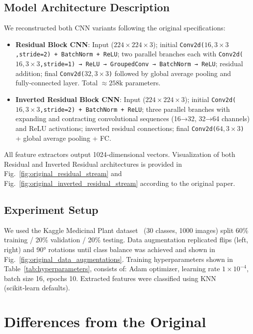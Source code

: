 \documentclass[journal,onecolumn]{IEEEtran}
\begin{document}
\subsection{Model Architecture Description}
We reconstructed both CNN variants following the original specifications:
\begin{itemize}
  \item \textbf{Residual Block CNN}: Input ($224\times224\times3$); initial \texttt{Conv2d($16,3\times3$,stride=2) + BatchNorm + ReLU}; two parallel branches each with \texttt{Conv2d($16,3\times3$,stride=1) → ReLU → GroupedConv → BatchNorm → ReLU}; residual addition; final \texttt{Conv2d($32,3\times3$)} followed by global average pooling and fully‑connected layer. Total \(\approx258\text{k}\) parameters.
  \item \textbf{Inverted Residual Block CNN}: Input ($224\times224\times3$); initial \texttt{Conv2d($16,3\times3$,stride=2) + BatchNorm + ReLU}; three parallel branches with expanding and contracting convolutional sequences (16→32, 32→64 channels) and ReLU activations; inverted residual connections; final \texttt{Conv2d($64,3\times3$)} + global average pooling + FC.
\end{itemize}
All feature extractors output 1024‑dimensional vectors. Visualization of both Residual and Inverted Residual architectures is provided in Fig.~\ref{fig:original_residual_stream} and Fig.~\ref{fig:original_inverted_residual_stream} according to the original paper.

\subsection{Experiment Setup}
We used the Kaggle Medicinal Plant dataset~\cite{KaggleDataset} (30 classes, 1000 images) split 60\% training / 20\% validation / 20\% testing. Data augmentation replicated flips (left, right) and 90° rotations until class balance was achieved and shown in Fig.~\ref{fig:original_data_augmentations}. Training hyperparameters shown in Table~\ref{tab:hyperparameters}, consists of: Adam optimizer, learning rate \(1\times10^{-4}\), batch size 16, epochs 10. Extracted features were classified using KNN (scikit‑learn defaults).


\section{Differences from the Original}
\end{document}
